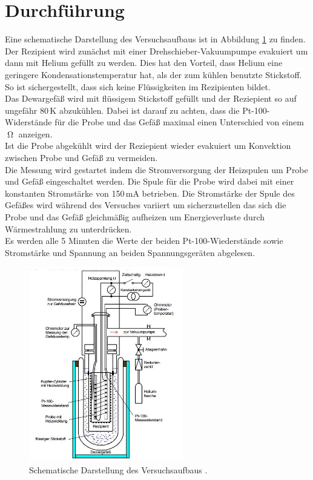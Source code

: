 \section{Durchführung}
\label{sec:Durchführung}
Eine schematische Darstellung des Versuchsaufbaus ist in Abbildung \ref{fig:Aufbau} zu finden.\\
Der Rezipient wird zunächst mit einer Drehschieber-Vakuumpumpe evakuiert um dann mit Helium gefüllt zu werden.
Dies hat den Vorteil, dass Helium eine
geringere Kondensationstemperatur hat, als der zum kühlen benutzte Stickstoff. So ist sichergestellt, dass sich
keine Flüssigkeiten im Rezipienten bildet.\\
Das Dewargefäß wird mit flüssigem Stickstoff gefüllt und der Reziepient so auf ungefähr 80\,K abzukühlen. Dabei ist darauf
zu achten, dass die Pt-100-Widerstände für die Probe und das Gefäß maximal einen Unterschied von einem $\upOmega$ anzeigen.\\
Ist die Probe abgekühlt wird der Reziepient wieder evakuiert um Konvektion zwischen Probe und Gefäß zu vermeiden.\\
Die Messung wird gestartet indem die Stromversorgung der Heizspulen um Probe und Gefäß eingeschaltet werden. Die Spule für
die Probe wird dabei mit einer konstanten Stromstärke von 150\,mA betrieben. Die Stromstärke der Spule des Gefäßes wird
während des Versuches variiert um sicherzustellen das sich die Probe und das Gefäß gleichmäßig aufheizen um Energieverluste
durch Wärmestrahlung zu unterdrücken.\\
Es werden alle 5 Minuten die Werte der beiden Pt-100-Wiederstände sowie Stromstärke und Spannung an beiden Spannungsgeräten
abgelesen.
\begin{figure}
  \centering
  \includegraphics[width=0.6\textwidth]{pics/Aufbau.JPG}
  \caption{Schematische Darstellung des Versuchsaufbaus \cite{Anleitung}.}
  \label{fig:Aufbau}
\end{figure}
